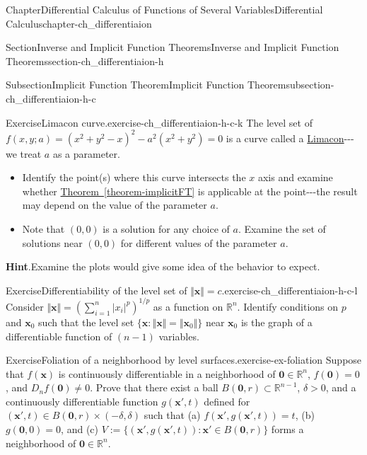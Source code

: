\documentclass[oneside,10pt,]{book}
\newcommand{\blocktitlefont}{\relax}
\newcommand{\xreffont}{\relax}
\numberwithin{equation}{section}
\newcommand{\bx}{\mathbf{x}}
\newcommand{\bbR}{\mathbb{R}}
\begin{document}
\begin{chapterptx}{Chapter}{Differential Calculus of Functions of Several Variables}{}{Differential Calculus}{}{}{chapter-ch_differentiaion}
\begin{sectionptx}{Section}{Inverse and Implicit Function Theorems}{}{Inverse and Implicit Function Theorems}{}{}{section-ch_differentiaion-h}
\begin{subsectionptx}{Subsection}{Implicit Function Theorem}{}{Implicit Function Theorem}{}{}{subsection-ch_differentiaion-h-c}
\begin{inlineexercise}{Exercise}{Limacon  curve.}{exercise-ch_differentiaion-h-c-k}%
The level set of \(f(x, y; a)=(x^{2}+y^{2}-x)^{2}-a^{2}(x^{2}+y^{2})=0\) is a curve called a \href{https://www.desmos.com/calculator/51n6sf9wxz}{Limacon}\footnotemark{}-{}-{}-we treat \(a\) as a parameter. %
\begin{itemize}[label=\textbullet]
\item{}Identify the point(s) where this curve intersects the \(x\) axis and examine whether \hyperref[theorem-implicitFT]{Theorem~{\xreffont\ref{theorem-implicitFT}}} is applicable at the point-{}-{}-the result may depend on the value of the parameter \(a\).%
\item{}Note that \((0, 0)\) is a solution for any choice of \(a\). Examine the set of solutions near \((0, 0)\) for different values of the parameter \(a\).%
\end{itemize}
\par\smallskip%
\noindent\textbf{\blocktitlefont Hint}.\hypertarget{hint-ch_differentiaion-h-c-k-c}{}\quad{}Examine the plots  would give some idea of the behavior to expect.\end{inlineexercise}%
%
\begin{inlineexercise}{Exercise}{Differentiability of the level set of \(\Vert \bx \Vert =c\).}{exercise-ch_differentiaion-h-c-l}%
Consider \(\Vert\bx\Vert =\left(\sum_{i=1}^{n}|x_{i}|^{p}\right)^{1/p}\) as a function on \(\bbR^{n}\). Identify conditions on \(p\) and \(\bx_{0}\) such that the level set \(\{\bx: \Vert\bx\Vert =\Vert\bx_{0}\Vert \}\) near \(\bx_{0}\) is the graph of a differentiable function of  \((n-1)\) variables.\end{inlineexercise}%
\begin{inlineexercise}{Exercise}{Foliation of a neighborhood by level surfaces.}{exercise-ex-foliation}%
Suppose that \(f(\bx)\) is continuously differentiable in a neighborhood of \(\mathbf 0\in\bbR^{n}\), \(f(\mathbf 0)=0\), and \(D_{n}f(\mathbf 0)\ne 0\). Prove that there exist a ball \(B(\mathbf 0, r)\subset \bbR^{n-1}\), \(\delta >0\), and a continuously differentiable function \(g(\bx', t)\) defined for \((\bx', t)\in  B(\mathbf 0, r) \times (-\delta, \delta)\) such that (a) \(f(\bx', g(\bx', t))=t\), (b) \(g(\mathbf 0, 0)=0\), and (c) \(V:=\{(\bx', g(\bx', t)): \bx'\in  B(\mathbf 0, r) \}\) forms a neighborhood of \(\mathbf 0\in\bbR^{n}\).%
\par

\end{inlineexercise}
\end{subsectionptx}
\end{sectionptx}
\end{chapterptx}
\end{document}
